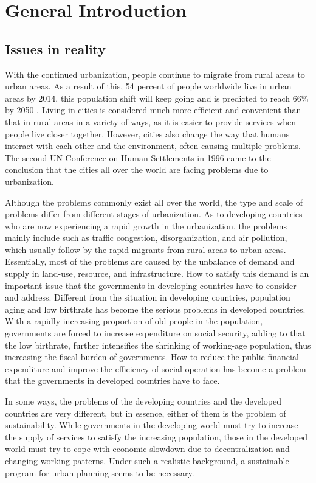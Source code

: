 \chapter{General Introduction}

%
\section{Issues in reality}
With the continued urbanization, people continue to migrate from rural areas to urban areas. As a result of this, 54 percent of people worldwide live in urban areas by 2014, this population shift will keep going and is predicted to reach 66\% by 2050 \cite{UN2014world}. Living in cities is considered much more efficient and convenient than that in rural areas in a variety of ways, as it is easier to provide services when people live closer together. However, cities also change the way that humans interact with each other and the environment, often causing multiple problems. The second UN Conference on Human Settlements in 1996 came to the conclusion that the cities all over the world are facing problems due to urbanization.

Although the problems commonly exist all over the world, the type and scale of problems differ from different stages of urbanization. As to developing countries who are now experiencing a rapid growth in the urbanization, the problems mainly include such as traffic congestion, disorganization, and air pollution, which usually follow by the rapid migrants from rural areas to urban areas. Essentially, most of the problems are caused by the unbalance of demand and supply in land-use, resource, and infrastructure. How to satisfy this demand is an important issue that the governments in developing countries have to consider and address. Different from the situation in developing countries, population aging and low birthrate has become the serious problems in developed countries. With a rapidly increasing proportion of old people in the population, governments are forced to increase expenditure on social security, adding to that the low birthrate, further intensifies the shrinking of working-age population, thus increasing the fiscal burden of governments. How to reduce the public financial expenditure and improve the efficiency of social operation has become a problem that the governments in developed countries have to face. 

In some ways, the problems of the developing countries and the developed countries are very different, but in essence, either of them is the problem of sustainability. While governments in the developing world must try to increase the supply of services to satisfy the increasing population, those in the developed world must try to cope with economic slowdown due to decentralization and changing working patterns. Under such a realistic background, a sustainable program for urban planning seems to be necessary.


